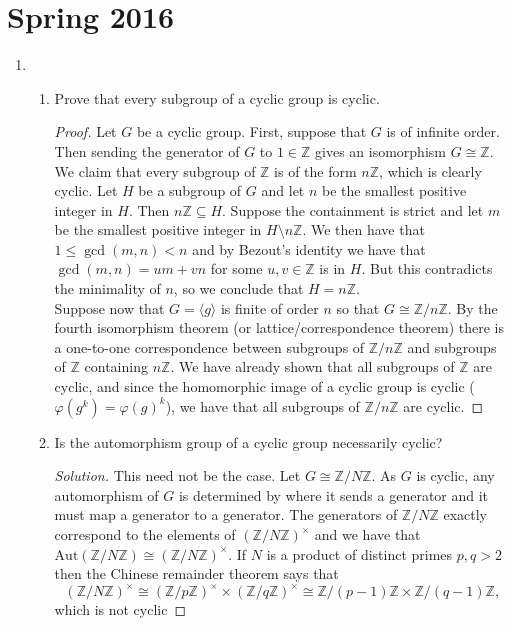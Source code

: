 \documentclass[11pt,letterpaper]{report}
\newcommand{\integers}{\mathbb{Z}}
\newcommand{\Aut}{\text{Aut}}
\newenvironment{solution}
{\begin{proof}[Solution]}
{\end{proof}}
\begin{document}
\section{Spring 2016}
\begin{enumerate}
	\item 
	\begin{enumerate}
		\item Prove that every subgroup of a cyclic group is cyclic.
		\begin{proof}
			Let $G$ be a cyclic group. First, suppose that $G$ is of infinite order. Then sending the generator of $G$ to $1\in \integers$ gives an isomorphism $G\cong \integers$. We claim that every subgroup of $\integers$ is of the form $n\integers$, which is clearly cyclic. Let $H$ be a subgroup of $G$ and let $n$ be the smallest positive integer in $H$. Then $n\integers \subseteq H$. Suppose the containment is strict and let $m$ be the smallest positive integer in $H\setminus n\integers$. We then have that $1\leq \gcd(m,n)<n$ and by Bezout's identity we have that $\gcd(m,n) = um+vn$ for some $u,v\in \integers$ is in $H$. But this contradicts the minimality of $n$, so we conclude that $H= n\integers$.\\

			\noindent Suppose now that $G = \langle g\rangle$ is finite of order $n$ so that $G\cong \integers/n\integers$. By the fourth isomorphism theorem (or lattice/correspondence theorem) there is a one-to-one correspondence between subgroups of $\integers/n\integers$ and subgroups of $\integers$ containing $n\integers$. We have already shown that all subgroups of $\integers$ are cyclic, and since the homomorphic image of a cyclic group is cyclic ($\varphi(g^k) = \varphi(g)^k$), we have that all subgroups of $\integers/n\integers$ are cyclic.
		\end{proof}

		\item Is the automorphism group of a cyclic group necessarily cyclic?
		\begin{solution}
			This need not be the case. Let $G \cong \integers/N\integers$. As $G$ is cyclic, any automorphism of $G$ is determined by where it sends a generator and it must map a generator to a generator. The generators of $\integers/N\integers$ exactly correspond to the elements of $(\integers/N\integers)^\times$ and we have that $\Aut(\integers/N\integers) \cong (\integers/N\integers)^\times$. If $N$ is a product of distinct primes $p, q>2$ then the Chinese remainder theorem says that
			\[
			(\integers/N\integers)^\times \cong (\integers/p\integers)^\times \times (\integers/q\integers)^\times \cong \integers/(p-1)\integers \times \integers/(q-1)\integers,
			\]
			which is not cyclic
		\end{solution}
	\end{enumerate}


\end{enumerate}
\end{document}
